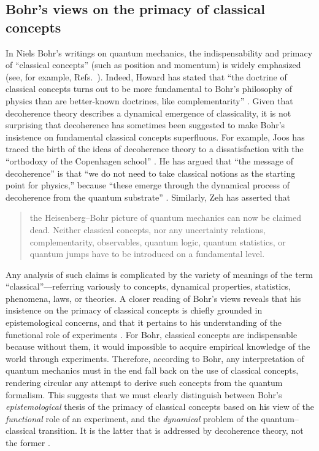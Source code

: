 \documentclass[3p,sort&compress]{elsarticle}
\begin{document}
\subsection{\label{sec:niels-bohrs-views}Bohr's views on the primacy of classical concepts}

In Niels Bohr's writings on quantum mechanics, the indispensability and primacy of ``classical concepts'' (such as position and momentum) is widely emphasized (see, for example, Refs.~\cite{Bohr:1949:mz,Bohr:1931:ii,Bohr:1935:re,Bohr:1996:mn,Bohr:1987:oo,Bohr:1958:lu}). Indeed, Howard has stated that ``the doctrine of classical concepts turns out to be more fundamental to Bohr's philosophy of physics than are better-known doctrines, like complementarity'' \cite[p.~202]{Howard:1994:lm}. Given that decoherence theory describes a dynamical emergence of classicality, it is not surprising that decoherence has sometimes been suggested to make Bohr's insistence on fundamental classical concepts superfluous. For example, Joos has traced the birth of the ideas of decoherence theory to a dissatisfaction with the ``orthodoxy of the Copenhagen school'' \cite[p.~54]{Joos:2006:yy}. He has argued that ``the message of decoherence'' is that ``we do not need to take classical notions as the starting point for physics,'' because ``these emerge through the dynamical process of decoherence from the quantum substrate'' \cite[p.~77]{Joos:2006:yy}. Similarly, Zeh \cite{Zeh:2000:rr} has asserted that
%
\begin{quote}
the Heisenberg--Bohr picture of quantum mechanics can now be claimed dead. Neither classical concepts, nor any uncertainty relations, complementarity, observables, quantum logic, quantum statistics, or quantum jumps have to be introduced on a fundamental level.
\end{quote}
%
Any analysis of such claims is complicated by the variety of meanings of the term ``classical''---referring variously to concepts, dynamical properties, statistics, phenomena, laws, or theories. A closer reading of Bohr's views reveals that his insistence on the primacy of classical concepts is chiefly grounded in epistemological concerns, and that it pertains to his understanding of the functional role of experiments \cite{Camilleri:2015:oo,Schlosshauer:2017:oo}. For Bohr, classical concepts are indispensable because without them, it would impossible to acquire empirical knowledge of the world through experiments. Therefore, according to Bohr, any interpretation of quantum mechanics must in the end fall back on the use of classical concepts, rendering circular any attempt to derive such concepts from the quantum formalism. This suggests that we must clearly distinguish between Bohr's \emph{epistemological} thesis of the primacy of classical concepts based on his view of the \emph{functional} role of an experiment, and the \emph{dynamical} problem of the quantum--classical transition. It is the latter that is addressed by decoherence theory, not the former  \cite{Camilleri:2015:oo,Schlosshauer:2017:oo}. 
\end{document}
